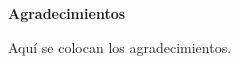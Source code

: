 \emph{ }

\vspace{7mm}
\textbf{\huge{Agradecimientos}}
\vspace{2mm}

Aquí se colocan los agradecimientos. 

\cleardoublepage

